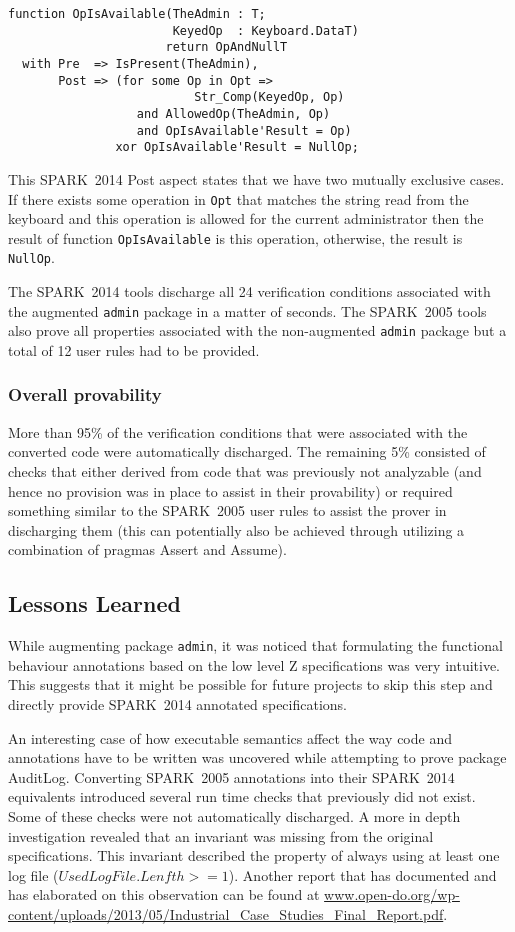 \documentclass[10pt,a4paper,twocolumn]{article}
\newcommand{\oldspark}{SPARK~2005\xspace}
\newcommand{\newspark}{SPARK~2014\xspace}
\newcommand{\SPARK}[1]{\lstinline[language=Ada,basicstyle={\footnotesize
      \sffamily},framesep=0pt]$#1$}
\begin{document}
\begin{lstlisting}
function OpIsAvailable(TheAdmin : T;
                       KeyedOp  : Keyboard.DataT)
                      return OpAndNullT
  with Pre  => IsPresent(TheAdmin),
       Post => (for some Op in Opt =>
                          Str_Comp(KeyedOp, Op)
                  and AllowedOp(TheAdmin, Op)
                  and OpIsAvailable'Result = Op)
               xor OpIsAvailable'Result = NullOp;
\end{lstlisting}
This \newspark Post aspect states that we have two mutually
exclusive cases. If there exists some operation in \SPARK{Opt} that
matches the string read from the keyboard and this operation is
allowed for the current administrator then the result of function
\SPARK{OpIsAvailable} is this operation, otherwise, the result is
\SPARK{NullOp}.

The \newspark tools discharge all 24 verification conditions
associated with the augmented \SPARK{admin} package in a matter of
seconds. The \oldspark tools also prove all properties associated with
the non-augmented \SPARK{admin} package but a total of 12 user rules had
to be provided.

\subsubsection{Overall provability}

More than 95\% of the verification conditions that were associated
with the converted code were automatically discharged. The remaining
5\% consisted of checks that either derived from code that was
previously not analyzable (and hence no provision was in place to
assist in their provability) or required something similar to the
\oldspark user rules to assist the prover in discharging them (this
can potentially also be achieved through utilizing a combination of
pragmas Assert and Assume).

\subsection{Lessons Learned}

While augmenting package \SPARK{admin}, it was noticed that formulating
the functional behaviour annotations based on the low level Z
specifications was very intuitive. This suggests that it might be
possible for future projects to skip this step and directly provide
\newspark annotated specifications.

An interesting case of how executable semantics affect the way code
and annotations have to be written was uncovered while attempting to
prove package AuditLog. Converting \oldspark annotations into their
\newspark equivalents introduced several run time checks that
previously did not exist. Some of these checks were not automatically
discharged. A more in depth investigation revealed that an invariant
was missing from the original specifications. This invariant described
the property of always using at least one log file
($UsedLogFile.Lenfth >= 1$). Another report that has documented and
has elaborated on this observation can be found at
\url{www.open-do.org/wp-content/uploads/2013/05/Industrial_Case_Studies_Final_Report.pdf}.
\end{document}
